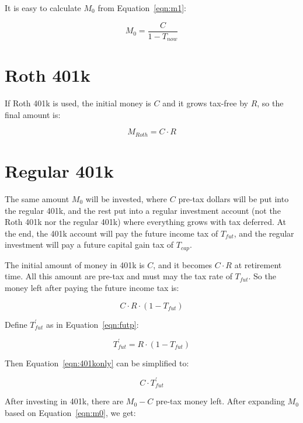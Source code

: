 \documentclass[twocolumn]{article}
\begin{document}
It is easy to calculate $M_{0}$ from Equation~\ref{eqn:m1}:

\begin{equation}
  M_{0} = \frac{C}{1 - T_{now}} \label{eqn:m1}
\end{equation}

\section{Roth 401k}

If Roth 401k is used, the initial money is $C$ and it grows tax-free by $R$, so the final
amount is:

\begin{equation}
  M_{Roth}= C \cdot R \label{eqn:roth2}
\end{equation}

\section{Regular 401k}

The same amount $M_{0}$ will be invested, where $C$ pre-tax dollars will be put
into the regular 401k, and the rest put into a regular investment account (not
the Roth 401k nor the regular 401k) where everything grows with tax deferred. At
the end, the 401k account will pay the future income tax of $T_{fut}$, and the
regular investment will pay a future capital gain tax of $T_{cap}$.

The initial amount of money in 401k is $C$, and it becomes $C \cdot R$ at
retirement time. All this amount are pre-tax and must may the tax rate of
$T_{fut}$. So the money left after paying the
future income tax is:

\begin{equation}
  C \cdot R \cdot (1 - T_{fut}) \label{eqn:401konly}
\end{equation}

Define $T_{fut}^{\prime}$ as in Equation~\ref{eqn:futp}:

\begin{equation}
  T_{fut}^{\prime} = R \cdot (1 - T_{fut}) \label{eqn:futp}
\end{equation}

Then Equation~\ref{eqn:401konly} can be simplified to:

\begin{equation}
  C \cdot T_{fut}^{\prime} \label{eqn:401konly2}
\end{equation}

After investing in 401k, there are $M_{0} - C$ pre-tax money left. After
expanding $M_{0}$ based on Equation~\ref{eqn:m0}, we get:
\end{document}
